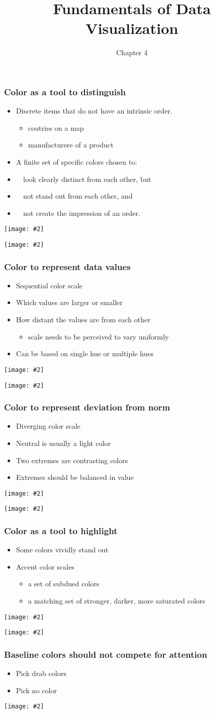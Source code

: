\documentclass{beamer}
\title{Fundamentals of Data Visualization}
\author{Chapter 4}
\newcommand{\bi}{\begin{itemize}}
\newcommand{\li}{\item}
\newcommand{\ei}{\end{itemize}}
\newcommand{\fig}[2]{\centerline{\texttt{[image: \#2]}}}
\newcommand{\bfr}[1]{\begin{frame}[fragile]\frametitle{{ #1 }}}
\begin{document}
\begin{frame}
\maketitle
\end{frame}

\bfr{Color as a tool to distinguish}
\bi
\li Discrete items that do not have an intrinsic order.
\bi\li coutries on a map\li manufacturere of a product\ei
\li A finite set of specific colors chosen to:
\li \ \ look clearly distinct from each other, but
\li \ \ not stand out from each other, and
\li \ \ not create the impression of an order.
\ei

\fig{1}{qualitative-scales-1.png}

\end{frame}

\begin{frame}
\fig{.7}{popgrowth-US-1.png}
\end{frame}


\bfr{Color to represent data values}
\bi
\li Sequential color scale
\li Which values are larger or smaller
\li How distant the values are from each other
\bi\li scale needs to be perceived to vary uniformly\ei
\li Can be based on single hue or multiple hues
\ei

\fig{1}{sequential-scales-1.png}

\end{frame}

\begin{frame}
\fig{1}{map-Texas-income-1.png}
\end{frame}


\bfr{Color to represent deviation from norm}
\bi
\li Diverging color scale
\li Neutral is usually a light color
\li Two extremes are contrasting colors
\li Extremes should be balanced in value
\ei

\fig{1}{diverging-scales-1.png}

\end{frame}

\begin{frame}
\fig{1}{map-Texas-race-1.png}
\end{frame}

\bfr{Color as a tool to highlight}
\bi
\li Some colors vividly stand out 
\li Accent color scales
\bi
\li a set of subdued colors
\li a matching set of stronger, darker, more saturated colors
\ei
\ei

\fig{1}{accent-scales-1.png}

\end{frame}

\begin{frame}
\fig{.7}{popgrowth-US-highlight-1.png}
\end{frame}


\bfr{Baseline colors should not compete for attention}
\bi
\li Pick drab colors
\li Pick no color
\ei

\fig{1}{Aus-athletes-track-1.png}

\end{frame}
\end{document}
